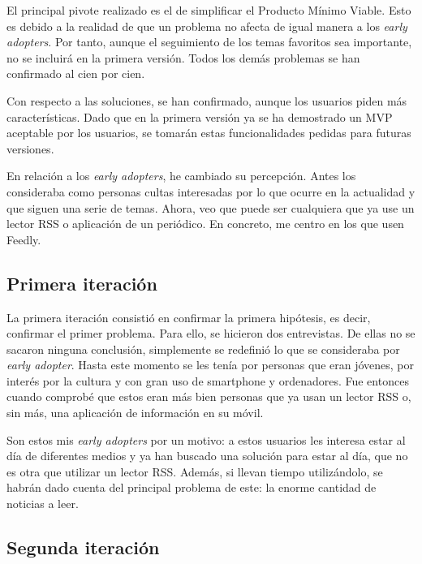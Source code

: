 El principal pivote realizado es el de simplificar el Producto Mínimo Viable. Esto es debido a la realidad de que un problema no afecta de igual manera a los \textit{early adopters}. Por tanto, aunque el seguimiento de los temas favoritos sea importante, no se incluirá en la primera versión. Todos los demás problemas se han confirmado al cien por cien.

Con respecto a las soluciones, se han confirmado, aunque los usuarios piden más características. Dado que en la primera versión ya se ha demostrado un MVP aceptable por los usuarios, se tomarán estas funcionalidades pedidas para futuras versiones.

En relación a los \textit{early adopters}, he cambiado su percepción. Antes los consideraba como personas cultas interesadas por lo que ocurre en la actualidad y que siguen una serie de temas. Ahora, veo que puede ser cualquiera que ya use un lector RSS o aplicación de un periódico. En concreto, me centro en los que usen Feedly.

\subsection{Primera iteración}

La primera iteración consistió en confirmar la primera hipótesis, es decir, confirmar el primer problema. Para ello, se hicieron dos entrevistas. De ellas no se sacaron ninguna conclusión, simplemente se redefinió lo que se consideraba por \textit{early adopter}. Hasta este momento se les tenía por personas que eran jóvenes, por interés por la cultura y con gran uso de smartphone y ordenadores. Fue entonces cuando comprobé que estos eran más bien personas que ya usan un lector RSS o, sin más, una aplicación de información en su móvil.

Son estos mis \textit{early adopters} por un motivo: a estos usuarios les interesa estar al día de diferentes medios y ya han buscado una solución para estar al día, que no es otra que utilizar un lector RSS. Además, si llevan tiempo utilizándolo, se habrán dado cuenta del principal problema de este: la enorme cantidad de noticias a leer.


\subsection{Segunda iteración}

